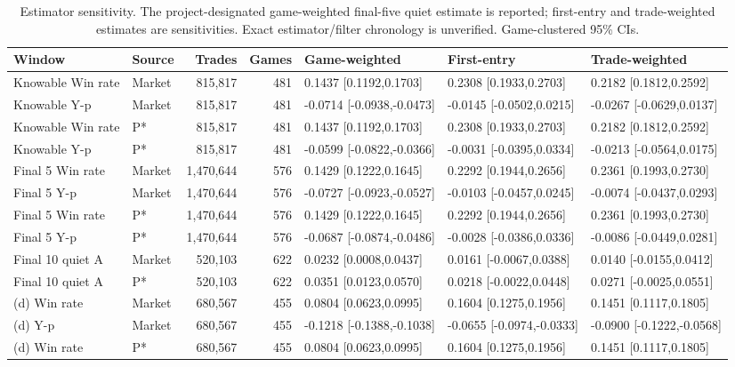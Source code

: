 \begin{table}[!htbp]
\centering
\scriptsize
\caption{Estimator sensitivity. The project-designated game-weighted final-five quiet estimate is reported; first-entry and trade-weighted estimates are sensitivities. Exact estimator/filter chronology is unverified. Game-clustered 95\% CIs.}
\label{tab:phase5-weighting}
\begin{tabular}{llrrlll}
\toprule
Window & Source & Trades & Games & Game-weighted & First-entry & Trade-weighted \\
\midrule
Knowable Win rate & Market & 815,817 & 481 & 0.1437 [0.1192,0.1703] & 0.2308 [0.1933,0.2703] & 0.2182 [0.1812,0.2592] \\
Knowable Y-p & Market & 815,817 & 481 & -0.0714 [-0.0938,-0.0473] & -0.0145 [-0.0502,0.0215] & -0.0267 [-0.0629,0.0137] \\
Knowable Win rate & P* & 815,817 & 481 & 0.1437 [0.1192,0.1703] & 0.2308 [0.1933,0.2703] & 0.2182 [0.1812,0.2592] \\
Knowable Y-p & P* & 815,817 & 481 & -0.0599 [-0.0822,-0.0366] & -0.0031 [-0.0395,0.0334] & -0.0213 [-0.0564,0.0175] \\
Final 5 Win rate & Market & 1,470,644 & 576 & 0.1429 [0.1222,0.1645] & 0.2292 [0.1944,0.2656] & 0.2361 [0.1993,0.2730] \\
Final 5 Y-p & Market & 1,470,644 & 576 & -0.0727 [-0.0923,-0.0527] & -0.0103 [-0.0457,0.0245] & -0.0074 [-0.0437,0.0293] \\
Final 5 Win rate & P* & 1,470,644 & 576 & 0.1429 [0.1222,0.1645] & 0.2292 [0.1944,0.2656] & 0.2361 [0.1993,0.2730] \\
Final 5 Y-p & P* & 1,470,644 & 576 & -0.0687 [-0.0874,-0.0486] & -0.0028 [-0.0386,0.0336] & -0.0086 [-0.0449,0.0281] \\
Final 10 quiet A & Market & 520,103 & 622 & 0.0232 [0.0008,0.0437] & 0.0161 [-0.0067,0.0388] & 0.0140 [-0.0155,0.0412] \\
Final 10 quiet A & P* & 520,103 & 622 & 0.0351 [0.0123,0.0570] & 0.0218 [-0.0022,0.0448] & 0.0271 [-0.0025,0.0551] \\
(d) Win rate & Market & 680,567 & 455 & 0.0804 [0.0623,0.0995] & 0.1604 [0.1275,0.1956] & 0.1451 [0.1117,0.1805] \\
(d) Y-p & Market & 680,567 & 455 & -0.1218 [-0.1388,-0.1038] & -0.0655 [-0.0974,-0.0333] & -0.0900 [-0.1222,-0.0568] \\
(d) Win rate & P* & 680,567 & 455 & 0.0804 [0.0623,0.0995] & 0.1604 [0.1275,0.1956] & 0.1451 [0.1117,0.1805] \\

\end{tabular}
\end{table}
